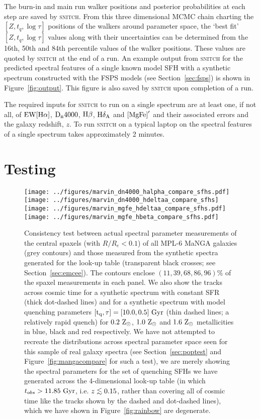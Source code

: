 \documentclass[useAMS,usenatbib]{mn2e}
\def\lesssim{\mathrel{\hbox{\rlap{\hbox{\lower3pt\hbox{$\sim$}}}\hbox{\raise2pt\hbox{$<$}}}}}
\begin{document}
The burn-in and main run walker positions and posterior probabilities at each step are saved by \textsc{snitch}. From this three dimensional MCMC chain charting the $[Z, t_q, \log \tau]$ positions of the walkers around parameter space, the `best fit' $[Z, t_q, \log \tau]$ values along with their uncertainties can be determined from the 16th, 50th and 84th percentile values of the walker positions. These values are quoted by \textsc{snitch} at the end of a run. An example output from \textsc{snitch} for the predicted spectral features of a single known model SFH with a synthetic spectrum constructed with the FSPS models (see Section~\ref{sec:fsps}) is shown in Figure~\ref{fig:output}. This figure is also saved by \textsc{snitch} upon completion of a run.  


The required inputs for \textsc{snitch} to run on a single spectrum are at least one, if not all, of $\rm{EW}[\rm{H}\alpha]$, $\rm{D}_n4000$, $\rm{H}\beta$, $\rm{H}\delta_A$ and $\rm{[MgFe]}^{\prime}$ and their associated errors and the galaxy redshift, $z$. To run \textsc{snitch} on a typical laptop on the spectral features of a single spectrum takes approximately 2 minutes. 

\section{Testing}\label{sec:test}

\begin{figure*}
\centering
\texttt{[image: ../figures/marvin\_dn4000\_halpha\_compare\_sfhs.pdf]}
\texttt{[image: ../figures/marvin\_dn4000\_hdeltaa\_compare\_sfhs]}
\texttt{[image: ../figures/marvin\_mgfe\_hdeltaa\_compare\_sfhs.pdf]}
\texttt{[image: ../figures/marvin\_mgfe\_hbeta\_compare\_sfhs.pdf]}
\caption{Consistency test between actual spectral parameter measurements of the central spaxels (with $R/R_e < 0.1$) of all MPL-6 MaNGA galaxies (grey contours) and those measured from the synthetic spectra generated for the look-up table (transparent black crosses; see Section~\ref{sec:emcee}). The contours enclose $(11, 39, 68, 86, 96)\%$ of the spaxel measurements in each panel. We also show the tracks across cosmic time for a synthetic spectrum with constant SFR (thick dot-dashed lines) and for a synthetic spectrum with model quenching parameters $[\rm{t}_q, \tau] = [10.0, 0.5]~\rm{Gyr}$ (thin dashed lines; a relatively rapid quench) for $0.2~\rm{Z}_{\odot}$, $1.0~\rm{Z}_{\odot}$ and $1.6~\rm{Z}_{\odot}$ metallicities in blue, black and red respectively. We have not attempted to recreate the distributions across spectral parameter space seen for this sample of real galaxy spectra (see Section~\ref{sec:poptest} and Figure~\ref{fig:mangacompare} for such a test), we are merely showing the spectral parameters for the set of quenching SFHs we have generated across the 4-dimensional look-up table (in which $t_{obs} > 11.85~\rm{Gyr}$, i.e. $z \lesssim 0.15$, rather than covering all of cosmic time like the tracks shown by the dashed and dot-dashed lines), which we have shown in Figure~\ref{fig:rainbow} are degenerate.}
\label{fig:compare_manga_specmeas}
\end{figure*}
\end{document}
